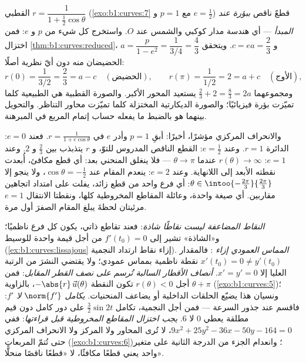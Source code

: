 \begin{example}
\label{ex:b1:curves:orbit}
 القطبي $r = \dfrac{1}{1 + \frac12\cos\theta}$
(\cref{exo:b1:curves:7} مع $p = 1$ و $e = \frac12$) قطعٌ
ناقص \emph{ببؤرة عند المبدأ} --- أي هندسة
مدار كوكبي والشمس عند $O$. واستخرج كل شيء من
$p$ و $e$: فمن اختزال
\cref{thm:b1:curves:reduced}، $a = \dfrac{p}{1 - e^2} =
\dfrac{1}{3/4} = \dfrac43$ و $c = ea = \dfrac23$. ويتحقق الحضيضان
منه دون أيّ نظرية أصلًا:
\[
r(0) = \frac{1}{3/2} = \frac23 = a - c
\quad (\text{الحضيض}),
\qquad
r(\pi) = \frac{1}{1/2} = 2 = a + c
\quad (\text{الأوج}),
\]
ومجموعهما $\frac23 + 2 = \frac83 = 2a$ يستعيد المحور
الأكبر. والصورة القطبية هي الطبيعية كلما تميّزت بؤرة
فيزيائيًا؛ والصورة الديكارتية المختزلة كلما تميّزت
محاور التناظر. والتحويل بينهما هو بالضبط
ما يفعله حساب إتمام المربع في المبرهنة.

والانحراف المركزي مؤشرًا، أخيرًا: أبقِ $p = 1$ وأدر $e$ في $r
= \frac{1}{1 + e\cos\theta}$. فعند $e = 0$: الدائرة $r = 1$. وعند
$e = \frac12$: القطع الناقص المدروس للتوّ، و $r$ يتذبذب بين
$\frac23$ و $2$. وعند $e = 1$: $r(\theta) \to \infty$ عندما $\theta
\to \pi$ --- فلا ينغلق المنحني بعد: أي قطع مكافئ، أُبعدت
نقطته الأبعد إلى اللانهاية. وعند $e = 2$: ينعدم المقام
عند $\cos\theta = -\frac12$، ولا ينجو إلا $\theta \in
\intoo{-\frac{2\pi}3}{\frac{2\pi}3}$: أي فرع واحد من قطع
زائد، يفلت على امتداد اتجاهين مقاربين. أي صيغة
واحدة، وعائلة المقاطع المخروطية كلها، ونقطتا الانتقال $e =
1$ مرئيتان لحظةَ يبلغ المقام الصفرَ أول مرة.
\end{example}

\begin{remark}
\label{rem:b1:curves:pitfalls}
\emph{النقاط المضاعفة ليست نقاطًا شاذة}: فعند
تقاطع ذاتي، يكون كل فرع ناظميًا؛ و«الشاذة» تشير إلى
$f'(t_0) = 0$ من أجل قيمة واحدة للوسيط
(\cref{ex:b1:curves:lissajous} إزاء نقاط ارتداد النجمية).
\emph{المماس العمودي إزاء }: فالمقدار $x'(t_0) = 0 \neq y'(t_0)$
نقطة ناظمية بمماس عمودي؛ ولا يقتضي النشرَ من الرتبة العليا
إلا $x' = y' = 0$.
\emph{أنصاف الأقطار السالبة تُرسم على نصف القطر المقابل}: فمن أجل $r(\theta) <
0$ تكون النقطة $-\abs{r}\,\vec u(\theta)$، بالزاوية $\theta +
\pi$ (\cref{exo:b1:curves:5})؛ ونسيان هذا يضيّع الحلقات الداخلية
أو يضاعف المنحنيات.
\emph{ يكامل $\norm{f'}$ لا $f'$}: فاقسم
 عند جذور السرعة --- فمن أجل النجمية،
تكامل $\frac32\sin 2t$ على دور كامل دون قيم مطلقة
يعطي $0$ لا $6$.
\emph{يجب اختزال المقاطع المخروطية قبل قراءتها}: ففي $9x^2 +
25y^2 - 36x - 50y - 164 = 0$، لا تُرى المحاور ولا المركز
ولا الانحراف المركزي حتى تُتمّ المربعات
(\cref{exo:b1:curves:6})؛ وانعدام الجزء من الدرجة الثانية على
متغير واحد يعني قطعًا مكافئًا، لا «قطعًا ناقصًا منحلًّا».
\end{remark}


